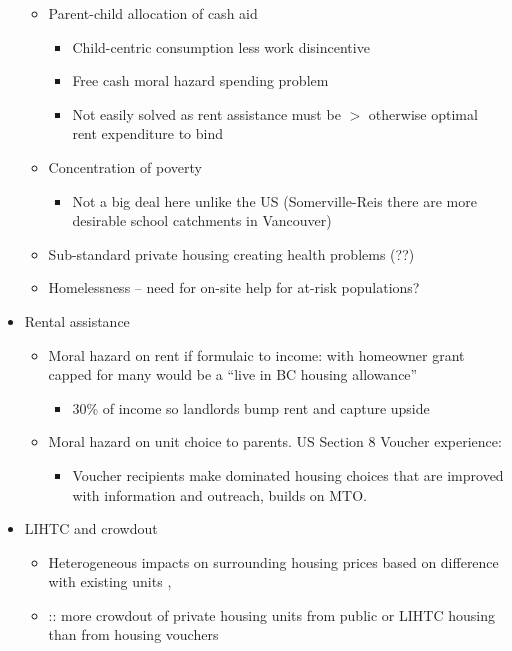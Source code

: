 \documentclass[12pt]{article}
\begin{document}
\begin{itemize}
\begin{itemize}
\begin{itemize}
				\end{itemize}
			\item Parent-child allocation of cash aid
				\begin{itemize}
					\item Child-centric consumption less work disincentive
					\item Free cash moral hazard spending problem
					\item Not easily solved as rent assistance must be $>$ otherwise optimal rent expenditure to bind
				\end{itemize}
			\item Concentration of poverty
				\begin{itemize}
					\item Not a big deal here unlike the US (Somerville-Reis there are more desirable school catchments in Vancouver)
				\end{itemize}
			\item Sub-standard private housing creating health problems (??)
			\item Homelessness -- need for on-site help for at-risk populations?
		\end{itemize}
	\item Rental assistance
		\begin{itemize}
			\item Moral hazard on rent if formulaic to income: with homeowner grant capped for many would be a ``live in BC housing allowance''
				\begin{itemize}
					\item \textcite{EriksenRoss} 30\% of income so landlords bump rent and capture upside
				\end{itemize}
			\item Moral hazard on unit choice to parents. US Section 8 Voucher experience: 
				\begin{itemize}
					\item \textcite{PalmerChettyetc} Voucher recipients make dominated housing choices that are improved with information and outreach, builds on MTO.
				\end{itemize}
		\end{itemize}
	\item LIHTC and crowdout
		\begin{itemize}
			\item Heterogeneous impacts on surrounding housing prices based on difference with existing units \textcite{DiamondMcQuade}, \textcite{BaumSnowMarion}
			\item \textcite{SinaiWaldfogelcrowdout}:: more crowdout of private housing units from public or LIHTC housing than from housing vouchers

\end{itemize}
\end{itemize}
\end{document}
